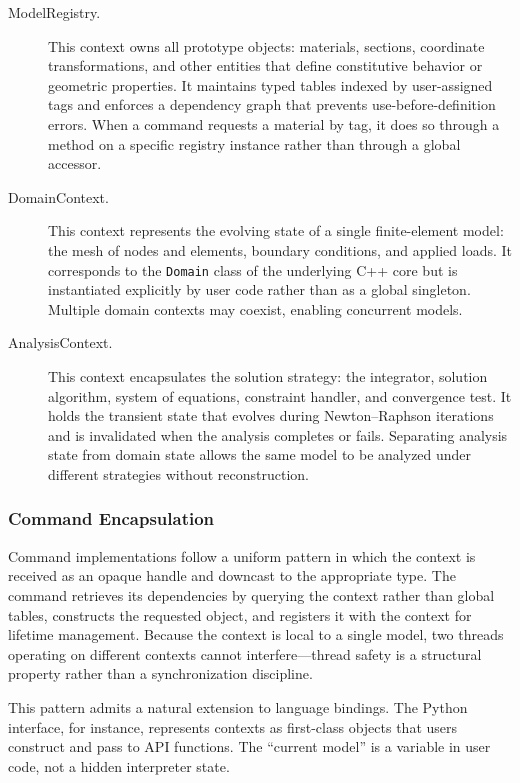 \begin{description}
\item[ModelRegistry.]
This context owns all prototype objects: materials, sections, coordinate transformations, and other entities that define constitutive behavior or geometric properties. 
It maintains typed tables indexed by user-assigned tags and enforces a dependency graph that prevents use-before-definition errors. When a command requests a material by tag, it does so through a method on a specific registry instance rather than through a global accessor.

\item[DomainContext.]
This context represents the evolving state of a single finite-element model: the mesh of nodes and elements, boundary conditions, and applied loads. It corresponds to the \texttt{Domain} class of the underlying C++ core but is instantiated explicitly by user code rather than as a global singleton. Multiple domain contexts may coexist, enabling concurrent models.

\item[AnalysisContext.]
This context encapsulates the solution strategy: the integrator, solution algorithm, system of equations, constraint handler, and convergence test. It holds the transient state that evolves during Newton--Raphson iterations and is invalidated when the analysis completes or fails. Separating analysis state from domain state allows the same model to be analyzed under different strategies without reconstruction.
\end{description}

\subsubsection{Command Encapsulation}

Command implementations follow a uniform pattern in which the context is received as an opaque handle and downcast to the appropriate type. The command retrieves its dependencies by querying the context rather than global tables, constructs the requested object, and registers it with the context for lifetime management. Because the context is local to a single model, two threads operating on different contexts cannot interfere---thread safety is a structural property rather than a synchronization discipline.

This pattern admits a natural extension to language bindings. The Python interface, for instance, represents contexts as first-class objects that users construct and pass to API functions. The ``current model'' is a variable in user code, not a hidden interpreter state.


